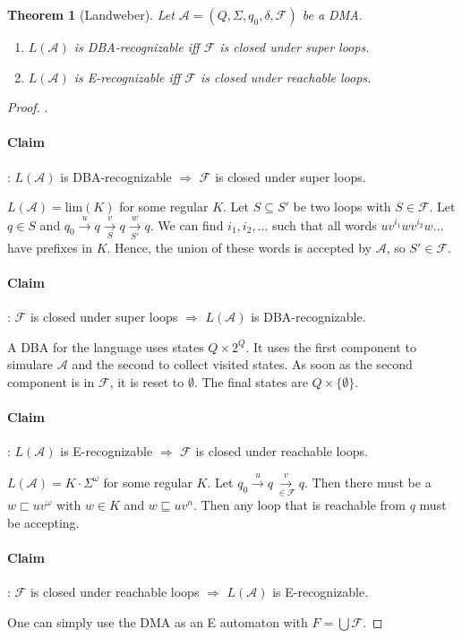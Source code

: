 \documentclass{article}
\newtheorem{theorem}{Theorem}
\begin{document}
\vspace{1cm}
\begin{theorem}[Landweber]
\label{landweber}
	Let $\mathcal{A} = (Q, \Sigma, q_0, \delta, \mathcal{F})$ be a DMA. 
	\begin{enumerate}
		\item $L(\mathcal{A})$ is DBA-recognizable iff $\mathcal{F}$ is closed under super loops.
		\item $L(\mathcal{A})$ is E-recognizable iff $\mathcal{F}$ is closed under reachable loops.
	\end{enumerate}
\end{theorem}
\begin{proof} .
	\paragraph{Claim}: $L(\mathcal{A})$ is DBA-recognizable $\Rightarrow$ $\mathcal{F}$ is closed under super loops.
	
	$L(\mathcal{A}) = \text{lim}(K)$ for some regular $K$. Let $S \subseteq S'$ be two loops with $S \in \mathcal{F}$. Let $q \in S$ and $q_0 \overset{u}{\rightarrow} q \overset{v}{\underset{S}{\rightarrow}} q \overset{w}{\underset{S'}{\rightarrow}} q$. We can find $i_1, i_2, \dots$ such that all words $u v^{i_1} w v^{i_2} w \dots$ have prefixes in $K$. Hence, the union of these words is accepted by $\mathcal{A}$, so $S' \in \mathcal{F}$.
	
	\paragraph{Claim}: $\mathcal{F}$ is closed under super loops $\Rightarrow$ $L(\mathcal{A})$ is DBA-recognizable.
	
	A DBA for the language uses states $Q \times 2^Q$. It uses the first component to simulare $\mathcal{A}$ and the second to collect visited states. As soon as the second component is in $\mathcal{F}$, it is reset to $\emptyset$. The final states are $Q \times \{\emptyset\}$.
	
	\paragraph{Claim}: $L(\mathcal{A})$ is E-recognizable $\Rightarrow$ $\mathcal{F}$ is closed under reachable loops. 
	
	$L(\mathcal{A}) = K \cdot \Sigma^\omega$ for some regular $K$. Let $q_0 \overset{u}{\rightarrow} q \overset{v}{\underset{\in \mathcal{F}}{\rightarrow}} q$. Then there must be a $w \sqsubset uv^\omega$ with $w \in K$ and $w \sqsubseteq uv^n$. Then any loop that is reachable from $q$ must be accepting.
	
	\paragraph{Claim}: $\mathcal{F}$ is closed under reachable loops $\Rightarrow$ $L(\mathcal{A})$ is E-recognizable. 
	
	One can simply use the DMA as an E automaton with $F = \bigcup \mathcal{F}$.
\end{proof}
\end{document}
